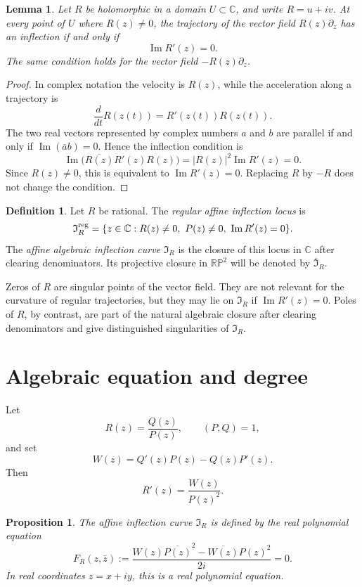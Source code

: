 \documentclass[11pt,reqno]{amsart}
\newtheorem{proposition}[theorem]{Proposition}
\newtheorem{lemma}[theorem]{Lemma}
\theoremstyle{definition}
\newtheorem{definition}[theorem]{Definition}
\theoremstyle{remark}
\newcommand{\C}{\mathbb C}
\newcommand{\RP}{\mathbb {RP}}
\newcommand{\I}{\mathfrak I}
\renewcommand{\Im}{\operatorname{Im}}
\begin{document}
\begin{lemma}\label{lem:analytic-inflection}
Let $R$ be holomorphic in a domain $U\subset\C$, and write $R=u+iv$.  At every point of $U$ where $R(z)\ne0$, the trajectory of the vector field $R(z)\partial_z$ has an inflection if and only if
\[
        \Im R'(z)=0.
\]
The same condition holds for the vector field $-R(z)\partial_z$.
\end{lemma}

\begin{proof}
In complex notation the velocity is $R(z)$, while the acceleration along a trajectory is
\[
        \frac{d}{dt}R(z(t))=R'(z(t))R(z(t)).
\]
The two real vectors represented by complex numbers $a$ and $b$ are parallel if and only if $\Im(\overline a b)=0$.  Hence the inflection condition is
\[
        \Im\bigl(\overline{R(z)}R'(z)R(z)\bigr)=|R(z)|^2\Im R'(z)=0.
\]
Since $R(z)\ne0$, this is equivalent to $\Im R'(z)=0$.  Replacing $R$ by $-R$ does not change the condition.
\end{proof}

\begin{definition}\label{def:inflection-curve}
Let $R$ be rational.  The \emph{regular affine inflection locus} is
\[
        \I_R^{\rm reg}=\{z\in\C: R(z)\ne0,\ P(z)\ne0,\ \Im R'(z)=0\}.
\]
The \emph{affine algebraic inflection curve} $\I_R$ is the closure of this locus in $\C$ after clearing denominators.  Its projective closure in $\RP^2$ will be denoted by $\overline{\I}_R$.
\end{definition}

Zeros of $R$ are singular points of the vector field.  They are not relevant for the curvature of regular trajectories, but they may lie on $\I_R$ if $\Im R'(z)=0$.  Poles of $R$, by contrast, are part of the natural algebraic closure after clearing denominators and give distinguished singularities of $\I_R$.

\section{Algebraic equation and degree}\label{sec:Degree}

Let
\[
        R(z)=\frac{Q(z)}{P(z)},
        \qquad (P,Q)=1,
\]
and set
\[
        W(z)=Q'(z)P(z)-Q(z)P'(z).
\]
Then
\[
        R'(z)=\frac{W(z)}{P(z)^2}.
\]

\begin{proposition}\label{prop:equation}
The affine inflection curve $\I_R$ is defined by the real polynomial equation
\begin{equation}\label{eq:defining-polynomial}
        F_R(z,\bar z):=\frac{W(z)\overline{P(z)}^{2}-\overline{W(z)}P(z)^2}{2i}=0.
\end{equation}
In real coordinates $z=x+iy$, this is a real polynomial equation.
\end{proposition}
\end{document}
